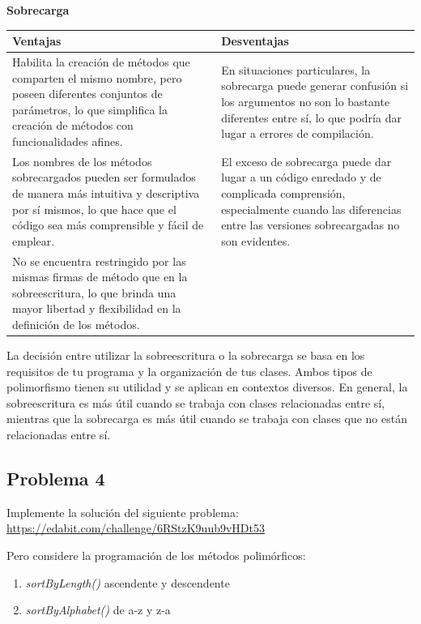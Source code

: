 \documentclass[11pt, twocolumn]{article}
\begin{document}
  \textbf{Sobrecarga}
  \begin{table}[h!]
    \footnotesize	
    \begin{tabular}{|p{}|p{}|}
      \hline
      \textbf{Ventajas} & \textbf{Desventajas} \\ \hline
      Habilita la creación de métodos que comparten el mismo nombre, pero poseen diferentes conjuntos de parámetros, lo que simplifica la creación de métodos con funcionalidades afines. & En situaciones particulares, la sobrecarga puede generar confusión si los argumentos no son lo bastante diferentes entre sí, lo que podría dar lugar a errores de compilación. \\ \hline

      Los nombres de los métodos sobrecargados pueden ser formulados de manera más intuitiva y descriptiva por sí mismos, lo que hace que el código sea más comprensible y fácil de emplear. & El exceso de sobrecarga puede dar lugar a un código enredado y de complicada comprensión, especialmente cuando las diferencias entre las versiones sobrecargadas no son evidentes. \\ \hline


      No se encuentra restringido por las mismas firmas de método que en la sobreescritura, lo que brinda una mayor libertad y flexibilidad en la definición de los métodos. & \\ \hline
    \end{tabular}
  \end{table}

  La decisión entre utilizar la sobreescritura o la sobrecarga se basa en los requisitos de tu programa y la organización de tus clases. Ambos tipos de polimorfismo tienen su utilidad y se aplican en contextos diversos. En general, la sobreescritura es más útil cuando se trabaja con clases relacionadas entre sí, mientras que la sobrecarga es más útil cuando se trabaja con clases que no están relacionadas entre sí.

  \subsection*{Problema 4}
  Implemente la solución del siguiente problema: \url{https://edabit.com/challenge/6RStzK9uub9vHDt53}

  Pero considere la programación de los métodos polimórficos:

  \begin{enumerate}[label=\alph*.]
    \item \textit{sortByLength()} ascendente y descendente
    \item \textit{sortByAlphabet()} de a-z y z-a
  \end{enumerate}
\end{document}

